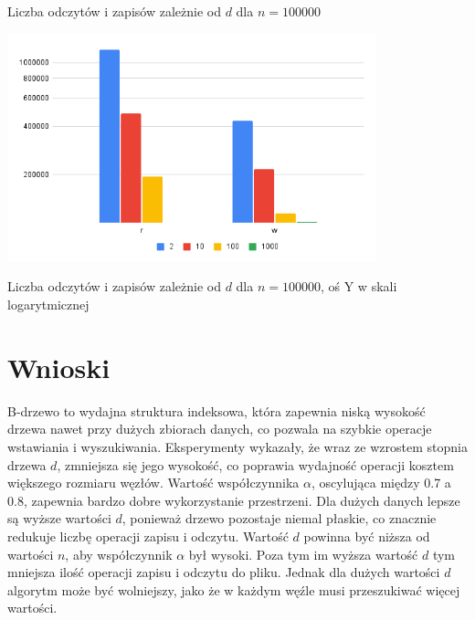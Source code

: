 \documentclass{article}
\begin{document}
\begin{center}
\begin{center}
    Liczba odczytów i zapisów zależnie od $d$ dla $n=100000$
    
    \includegraphics[width=0.8\textwidth]{images/chart_log.png}
    
    Liczba odczytów i zapisów zależnie od $d$ dla $n=100000$, oś Y w skali logarytmicznej
\end{center}

\end{center}


\section{Wnioski}
B-drzewo to wydajna struktura indeksowa, która zapewnia niską wysokość drzewa nawet przy dużych zbiorach danych, co pozwala na szybkie operacje wstawiania i wyszukiwania. Eksperymenty wykazały, że wraz ze wzrostem stopnia drzewa $d$, zmniejsza się jego wysokość, co poprawia wydajność operacji kosztem większego rozmiaru węzłów. Wartość współczynnika $\alpha$, oscylująca między 0.7 a 0.8, zapewnia bardzo dobre wykorzystanie przestrzeni. Dla dużych danych lepsze są wyższe wartości $d$, ponieważ drzewo pozostaje niemal płaskie, co znacznie redukuje liczbę operacji zapisu i odczytu. Wartość $d$ powinna być niższa od wartości $n$, aby współczynnik $\alpha$ był wysoki. Poza tym im wyższa wartość $d$ tym mniejsza ilość operacji zapisu i odczytu do pliku. Jednak dla dużych wartości $d$ algorytm może być wolniejszy, jako że w każdym węźle musi przeszukiwać więcej wartości. 
\end{document}
